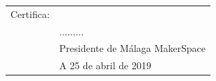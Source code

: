 \documentclass{scrartcl}
\begin{document}
	\vspace{2cm}
\begin{flushright}
	\begin{tabular}{@{}p{1.5cm}p{6cm}@{}}
Certifica: & \hrulefill \\[0.5cm]
& ......... \\
& Presidente de Málaga MakerSpace\\
& A 25 de abril de 2019
\end{tabular}
\end{flushright}
\end{document}
